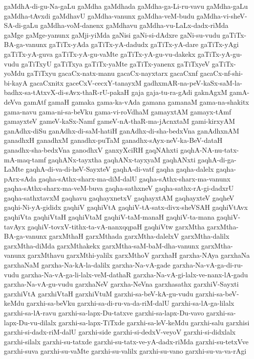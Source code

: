 {gaMdhA-di-gu-Na-gaLu
gaMdha
gaMdhada
gaMdha-ga-Li-ru-vavu
gaMdha-gaLu
gaMdha-tAvxdi
gaMdhavU
gaMdha-vanunx
gaMdha-veM-budu
gaMdha-vi-sheV-SA-di-gaLu
gaMdha-voM-danenx
gaMdhavu
gaMdha-vu-LaLx-dadx-riMda
gaMge
gaMge-yanunx
gaMji-yiMda
gaNisi
gaNi-si-dAdxre
gaNi-su-vudu
gaTiTx-BA-ga-vanunx
gaTiTx-yAda
gaTiTx-yA-dadudx
gaTiTx-yA-dare
gaTiTx-yAgi
gaTiTx-yA-guva
gaTiTx-yA-gu-vaMte
gaTiTx-yA-gu-vu-dakekx
gaTiTx-yA-gu-vudu
gaTiTxyU
gaTiTxya
gaTiTx-yaMte
gaTiTx-yanenx
gaTiTxyeV
gaTiTx-yoMdu
gaTiTxyu
gacaCx-natx-manu
gacaCx-nayxtarx
gacaCxnf
gacaCx-nf-shi-bi-kayA
gacaCxnitx
gaceCxV-cecxY-tanayxM
gadhxmAR-na-peV-kaSx-saM-la-badhx-sa-tAtxvX-di-sAvx-thaR-rU-pakaH
gaja
gaja-tu-ra-gAdi
gaknAgxM
gamA-deVva
gamAtf
gamaH
gamaka
gama-ka-vAda
gamana
gamanaM
gama-na-shakitx
gama-navu
gama-ni-sa-beVku
gama-vi-roVdhaM
gamayxtAM
gamayx-tAmf
gamayxteV
gameV-kaSx-Namf
gameV-nA-thaR-ma-jAcnxtaM
gami-kirxyAM
ganAdhx-diSu
ganAdhx-di-saM-hatiH
ganAdhx-di-sha-bedxVna
ganAdhxnAM
ganadhxH
ganadhxM
ganadhx-puTaM
ganadhx-sAyx-neV-ka-BeV-dataH
ganadhx-sha-bedxVna
ganodhxV
ganxyXciRH
gaqNAhxti
gaqhA-NA-nu-tatx-mA-maq-tamf
gaqhANx-tayxtha
gaqhANx-tayxyaM
gaqhANxti
gaqhA-di-ga-LaMte
gaqhA-di-va-di-heV-SayxteV
gaqhA-di-vatf
gaqha
gaqha-dalelx
gaqha-pArx-sAda
gaqha-sAthx-sharx-ma-diM-dalU
gaqha-sAthx-sharx-ma-vanunx
gaqha-sAthx-sharx-ma-veM-buva
gaqha-sathxneV
gaqha-sathx-rA-gi-dadxrU
gaqha-sathxtavxM
gaqhavu
gaqhayxnetxV
gaqhayxtAM
gaqhayxteV
gaqheV
gaqhi-Ni-yA-gididx
gaqhiV
gaqhiVtA
gaqhiV-tA-satx-divx-sheVSAH
gaqhiVtAvx
gaqhiVta
gaqhiVtaH
gaqhiVtaM
gaqhiV-taM-manaH
gaqhiV-ta-mana
gaqhiV-tavAyx
gaqhiV-tovxV-tithx-ta-vA-nanxqqpaH
gaqhiVtw
garxMtha
garxMtha-BA-ga-vanunx
garxMthaH
garxMthada
garxMtha-dalelxV
garxMtha-dalilx
garxMtha-diMda
garxMthakekx
garxMtha-saM-baM-dha-vanunx
garxMtha-vanunx
garxMthavu
garxMthi-yalilx
garxMthoV
garxhaH
garxha-NAya
garxhaNa
garxhaNaM
garxha-Na-kA-la-dalilx
garxha-Na-vA-gade
garxha-Na-vA-ga-di-ru-vudu
garxha-Na-vA-ga-li-lalx-veM-dathaR
garxha-Na-vA-gi-lalx-ve-nanx-lA-gadu
garxha-Na-vA-gu-vudu
garxhaNeV
garxha-NeVna
garxhasathx
garxhiV-Sayxti
garxhiVtA
garxhiVtaH
garxhiVtuM
garxhi-sa-beV-kA-gu-vudu
garxhi-sa-beV-keMdu
garxhi-sa-beVku
garxhi-sa-di-ru-va-da-riM-dalU
garxhi-sa-lA-ga-lilalx
garxhi-sa-lA-ravu
garxhi-sa-lapx-Du-tatxve
garxhi-sa-lapx-Du-vavo
garxhi-sa-lapx-Du-vu-dilalx
garxhi-sa-lapx-TiTxde
garxhi-sa-leV-keMdu
garxhi-salu
garxhisi
garxhi-si-dadx-riM-dalU
garxhi-side
garxhi-si-dedxV-veyoV
garxhi-si-didxlalx
garxhi-silalx
garxhi-su-tatxde
garxhi-su-tatx-ve-yA-dadx-riMda
garxhi-su-tetxVve
garxhi-suva
garxhi-su-vaMte
garxhi-su-valilx
garxhi-su-vano
garxhi-su-va-va-rAgi
}
